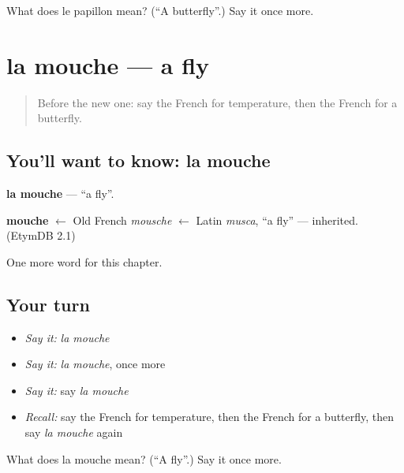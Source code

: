 \begin{tcolorbox}[breakable,colback=teal!4,colframe=teal!35!black,title={Before you move on}]
What does le papillon mean? (\textquotedblleft{}A butterfly\textquotedblright{}.) Say it once more.
\end{tcolorbox}
\section[la mouche]{la mouche — a fly}

\label{lesson:FR-C194-mouche}



\begin{quote}
Before the new one: say the French for temperature, then the French for a butterfly.
\end{quote}

\subsection*{You'll want to know: la mouche}
\textbf{la mouche} — \textquotedblleft{}a fly\textquotedblright{}.

\begin{cousinweb}
\textbf{mouche} $\leftarrow$ Old French \emph{mousche} $\leftarrow$ Latin \emph{musca}, \textquotedblleft{}a fly\textquotedblright{} — inherited. (EtymDB 2.1)
\end{cousinweb}

\begin{grammarlens}[title={What you've built}]
One more word for this chapter.
\end{grammarlens}

\subsection*{Your turn}
\begin{itemize}
\raggedright
  \item \emph{Say it:} \emph{la mouche}
  \item \emph{Say it:} \emph{la mouche}, once more
  \item \emph{Say it:} say \emph{la mouche}
  \item \emph{Recall:} say the French for temperature, then the French for a butterfly, then say \emph{la mouche} again
\end{itemize}

\begin{tcolorbox}[breakable,colback=teal!4,colframe=teal!35!black,title={Before you move on}]
What does la mouche mean? (\textquotedblleft{}A fly\textquotedblright{}.) Say it once more.
\end{tcolorbox}

